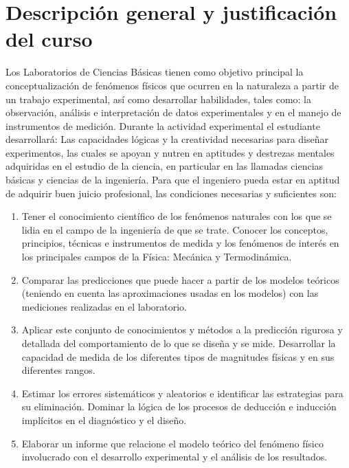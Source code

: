 \documentclass[12pt]{article}
\begin{document}

\tableofcontents
\pagebreak


\section{Descripción general y justificación del curso}

Los Laboratorios de Ciencias Básicas tienen como objetivo principal la conceptualización de fenómenos físicos que ocurren en la naturaleza a partir de un trabajo experimental, así como desarrollar habilidades, tales como: la observación, análisis e interpretación de datos experimentales y en el manejo de instrumentos de medición.
Durante la actividad experimental el estudiante desarrollará:
Las capacidades lógicas y la creatividad necesarias para diseñar experimentos, las cuales se apoyan y nutren en aptitudes y destrezas mentales adquiridas en el estudio de la ciencia, en particular en las llamadas ciencias básicas y ciencias de la ingeniería.
Para que el ingeniero pueda estar en aptitud de adquirir buen juicio profesional, las condiciones necesarias y suficientes son:

\begin{enumerate}[label=\alph*)]
\item Tener el conocimiento científico de los fenómenos naturales con los que se lidia en el campo de la ingeniería de que se trate. Conocer los conceptos, principios, técnicas e instrumentos de medida y los fenómenos de interés en los principales campos de la Física: Mecánica y Termodinámica.
\item Comparar las predicciones que puede hacer a partir de los modelos teóricos (teniendo en cuenta las aproximaciones usadas en los modelos) con las mediciones realizadas en el laboratorio.
\item Aplicar este conjunto de conocimientos y métodos a la predicción rigurosa y detallada del comportamiento de lo que se diseña y se mide. Desarrollar la capacidad de medida de los diferentes tipos de magnitudes físicas y en sus diferentes rangos.
\item Estimar los errores sistemáticos y aleatorios e identificar las estrategias para su eliminación. Dominar la lógica de los procesos de deducción e inducción implícitos en el diagnóstico y el diseño.
\item Elaborar un informe que relacione el modelo teórico del fenómeno físico involucrado con el desarrollo experimental y el análisis de los resultados.
\end{enumerate}
\end{document}
